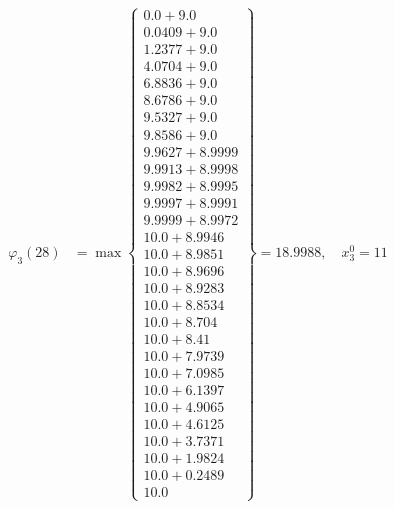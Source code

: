 \documentclass{article}
\begin{document}
\begin{align*}
\varphi_{3}(28) &= \max \left\{ \begin{array}{c}
0.0 + 9.0 \\
 0.0409 + 9.0 \\
 1.2377 + 9.0 \\
 4.0704 + 9.0 \\
 6.8836 + 9.0 \\
 8.6786 + 9.0 \\
 9.5327 + 9.0 \\
 9.8586 + 9.0 \\
 9.9627 + 8.9999 \\
 9.9913 + 8.9998 \\
 9.9982 + 8.9995 \\
 9.9997 + 8.9991 \\
 9.9999 + 8.9972 \\
 10.0 + 8.9946 \\
 10.0 + 8.9851 \\
 10.0 + 8.9696 \\
 10.0 + 8.9283 \\
 10.0 + 8.8534 \\
 10.0 + 8.704 \\
 10.0 + 8.41 \\
 10.0 + 7.9739 \\
 10.0 + 7.0985 \\
 10.0 + 6.1397 \\
 10.0 + 4.9065 \\
 10.0 + 4.6125 \\
 10.0 + 3.7371 \\
 10.0 + 1.9824 \\
 10.0 + 0.2489 \\
 10.0
\end{array} \right\}=18.9988, \quad x_{3}^0=11\\
  

\end{align*}
\end{document}
